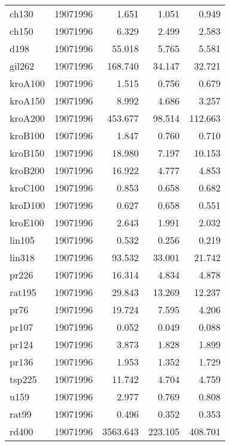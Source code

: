 \begin{center}
\begin{longtable}{llrrr}
ch130  & 19071996 & 1.651 & 1.051 & 0.949\\
ch150  & 19071996 & 6.329 & 2.499 & 2.583\\
d198  & 19071996 & 55.018 & 5.765 & 5.581\\
gil262  & 19071996 & 168.740 & 34.147 & 32.721\\
kroA100  & 19071996 & 1.515 & 0.756 & 0.679\\
kroA150  & 19071996 & 8.992 & 4.686 & 3.257\\
kroA200  & 19071996 & 453.677 & 98.514 & 112.663\\
kroB100  & 19071996 & 1.847 & 0.760 & 0.710\\
kroB150  & 19071996 & 18.980 & 7.197 & 10.153\\
kroB200  & 19071996 & 16.922 & 4.777 & 4.853\\
kroC100  & 19071996 & 0.853 & 0.658 & 0.682\\
kroD100  & 19071996 & 0.627 & 0.658 & 0.551\\
kroE100  & 19071996 & 2.643 & 1.991 & 2.032\\
lin105  & 19071996 & 0.532 & 0.256 & 0.219\\
lin318  & 19071996 & 93.532 & 33.001 & 21.742\\
pr226  & 19071996 & 16.314 & 4.834 & 4.878\\
rat195  & 19071996 & 29.843 & 13.269 & 12.237\\
pr76  & 19071996 & 19.724 & 7.595 & 4.206\\
pr107  & 19071996 & 0.052 & 0.049 & 0.088\\
pr124  & 19071996 & 3.873 & 1.828 & 1.899\\
pr136  & 19071996 & 1.953 & 1.352 & 1.729\\
tsp225  & 19071996 & 11.742 & 4.704 & 4.759\\
u159  & 19071996 & 2.977 & 0.769 & 0.808\\
rat99  & 19071996 & 0.496 & 0.352 & 0.353\\
rd400  & 19071996 & 3563.643 & 223.105 & 408.701\\
\end{longtable}
\end{center}


